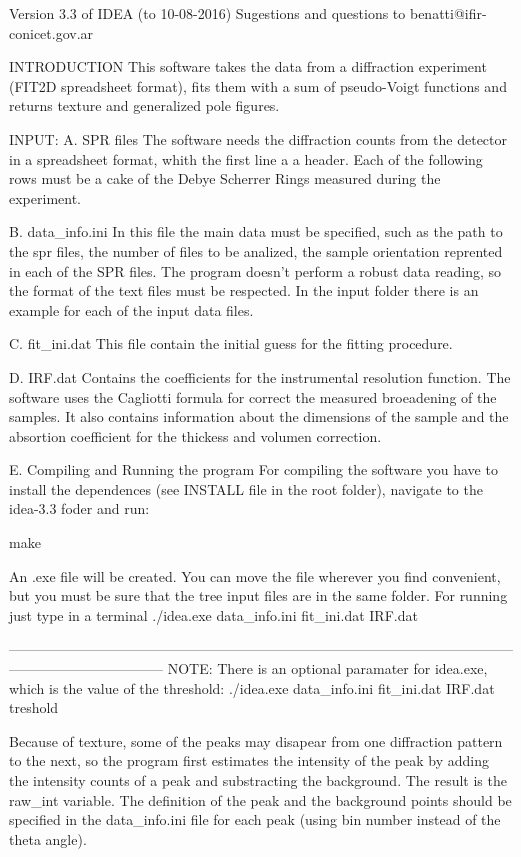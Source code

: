 Version 3.3 of IDEA (to 10-08-2016)
Sugestions and questions to benatti@ifir-conicet.gov.ar

INTRODUCTION
This software takes the data from a diffraction experiment (FIT2D spreadsheet format), fits them with a sum of pseudo-Voigt functions and returns texture and 
generalized pole figures.

INPUT:
A. SPR files
The software needs the diffraction counts from the detector in a spreadsheet format, whith the first line a a header. Each of the following rows must be
a cake of the Debye Scherrer Rings measured during the experiment.

B. data_info.ini
In this file the main data must be specified, such as the path to the spr files, the number of files to be analized, the sample orientation reprented in each
of the SPR files. The program doesn't perform a robust data reading, so the format of the text files must be respected. In the input folder there is an example
for each of the input data files.

C. fit_ini.dat
This file contain the initial guess for the fitting procedure.

D. IRF.dat
Contains the coefficients for the instrumental resolution function. The software uses the Cagliotti formula for correct the measured broeadening of the samples.
It also contains information about the dimensions of the sample and the absortion coefficient for the thickess and volumen correction.

E. Compiling and Running the program
For compiling the software you have to install the dependences (see INSTALL file in the root folder), navigate to the idea-3.3 foder and run:

make

An .exe file will be created. You can move the file wherever you find convenient, but you must be sure that the tree input files are in the same folder. For
running just type in a terminal
./idea.exe data_info.ini fit_ini.dat IRF.dat


---------------------------------------------------------------------------------------------------------------------------------------------
NOTE: There is an optional paramater for idea.exe, which is the value of the threshold:
./idea.exe data_info.ini fit_ini.dat IRF.dat treshold

Because of texture, some of the peaks may disapear from one diffraction pattern to the next, so the program first estimates the intensity of the peak by adding 
the intensity counts of a peak and substracting the background. The result is the raw_int variable. The definition of the peak and the background points should 
be specified in the data_info.ini file for each peak (using bin number instead of the theta angle).

